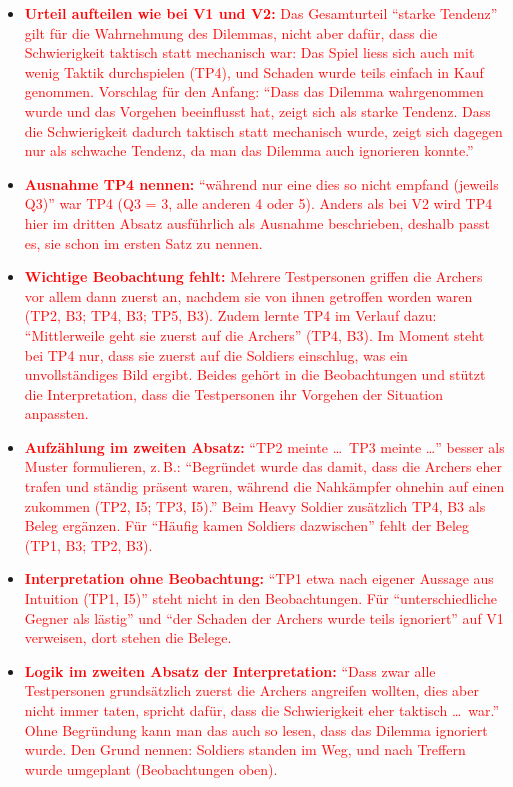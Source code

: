 \documentclass[../Main.tex]{subfiles}
\begin{document}
\begin{itemize}[leftmargin=1.5cm]
    \item \textcolor{red}{\textbf{Urteil aufteilen wie bei V1 und V2:} Das Gesamturteil \enquote{starke Tendenz} gilt für die Wahrnehmung des Dilemmas, nicht aber dafür, dass die Schwierigkeit taktisch statt mechanisch war: Das Spiel liess sich auch mit wenig Taktik durchspielen (TP4), und Schaden wurde teils einfach in Kauf genommen. Vorschlag für den Anfang: \enquote{Dass das Dilemma wahrgenommen wurde und das Vorgehen beeinflusst hat, zeigt sich als starke Tendenz. Dass die Schwierigkeit dadurch taktisch statt mechanisch wurde, zeigt sich dagegen nur als schwache Tendenz, da man das Dilemma auch ignorieren konnte.}}
    \item \textcolor{red}{\textbf{Ausnahme TP4 nennen:} \enquote{während nur eine dies so nicht empfand (jeweils Q3)} war TP4 (Q3 = 3, alle anderen 4 oder 5). Anders als bei V2 wird TP4 hier im dritten Absatz ausführlich als Ausnahme beschrieben, deshalb passt es, sie schon im ersten Satz zu nennen.}
    \item \textcolor{red}{\textbf{Wichtige Beobachtung fehlt:} Mehrere Testpersonen griffen die Archers vor allem dann zuerst an, nachdem sie von ihnen getroffen worden waren (TP2, B3; TP4, B3; TP5, B3). Zudem lernte TP4 im Verlauf dazu: \enquote{Mittlerweile geht sie zuerst auf die Archers} (TP4, B3). Im Moment steht bei TP4 nur, dass sie zuerst auf die Soldiers einschlug, was ein unvollständiges Bild ergibt. Beides gehört in die Beobachtungen und stützt die Interpretation, dass die Testpersonen ihr Vorgehen der Situation anpassten.}
    \item \textcolor{red}{\textbf{Aufzählung im zweiten Absatz:} \enquote{TP2 meinte \ldots\ TP3 meinte \ldots} besser als Muster formulieren, z.\,B.: \enquote{Begründet wurde das damit, dass die Archers eher trafen und ständig präsent waren, während die Nahkämpfer ohnehin auf einen zukommen (TP2, I5; TP3, I5).} Beim Heavy Soldier zusätzlich TP4, B3 als Beleg ergänzen. Für \enquote{Häufig kamen Soldiers dazwischen} fehlt der Beleg (TP1, B3; TP2, B3).}
    \item \textcolor{red}{\textbf{Interpretation ohne Beobachtung:} \enquote{TP1 etwa nach eigener Aussage aus Intuition (TP1, I5)} steht nicht in den Beobachtungen. Für \enquote{unterschiedliche Gegner als lästig} und \enquote{der Schaden der Archers wurde teils ignoriert} auf V1 verweisen, dort stehen die Belege.}
    \item \textcolor{red}{\textbf{Logik im zweiten Absatz der Interpretation:} \enquote{Dass zwar alle Testpersonen grundsätzlich zuerst die Archers angreifen wollten, dies aber nicht immer taten, spricht dafür, dass die Schwierigkeit eher taktisch \ldots\ war.} Ohne Begründung kann man das auch so lesen, dass das Dilemma ignoriert wurde. Den Grund nennen: Soldiers standen im Weg, und nach Treffern wurde umgeplant (Beobachtungen oben).}

\end{itemize}
\end{document}
